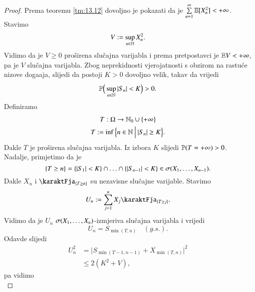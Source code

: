 \begin{proof}
    Prema teoremu \ref{tm:13.12} dovoljno je pokazati da je $\sum\limits_{n = 1}^{\infty} \mathbb{E} [ X_n^2 ] < +\infty$.
    Stavimo
    \begin{equation*}
        V := \sup\limits_{n \in \mathbb{N}} X_n^2.
    \end{equation*}
    Vidimo da je $V \geq 0$ pro\v sirena slu\v cajna varijabla i prema pretpostavci je $\mathbb{E} V < +\infty$, pa je $V$ slu\v cajna varijabla.
    Zbog neprekidnosti vjerojatnosti s obzirom na rastu\' ce nizove doga\dj aja, slijedi da postoji $K > 0$ dovoljno velik, takav da vrijedi
    \begin{equation*}
        \mathbb{P} \Big( \sup\limits_{n \in \mathbb{N}} |S_n| < K \Big) > 0.
    \end{equation*}
    Definiramo
    \begin{equation*}
        \begin{gathered}
            T: \Omega \to \mathbb{N}_0 \cup \{+\infty\}\\
            T:= \inf \Big\{ {n \in \mathbb{N}} \: \Big| \: {|S_n| \geq K} \Big\}.
        \end{gathered}
    \end{equation*}
    Dakle $T$ je pro\v sirena slu\v cajna varijabla.
    Iz izbora $K$ slijedi $\mathbb{P} (T = +\infty) > 0$.
    Nadalje, primjetimo da je
    \begin{equation*}
        \{T \geq n\} = \{ |S_1| < K \} \cap \ldots \cap \{|S_{n-1}| < K\} \in \sigma({X_1, \ldots, X_{n-1}}).
    \end{equation*}
    Dakle $X_n$ i $\karaktFja_{\{T \geq n\}}$ su nezavisne slu\v cajne varijable.
    Stavimo
    \begin{equation*}
        U_n := \suma{j = 1}{n} X_j \karaktFja_{\{T \geq j\}}.
    \end{equation*}
    Vidimo da je $U_n$ $\sigma({X_1, \ldots, X_n})$-izmjeriva slu\v cajna varijabla i vrijedi
    \begin{equation*}
        U_n = S_{\min (T, n)} \quad (g.s.).
    \end{equation*}
    Odavde slijedi
    \begin{equation*}
        \begin{aligned}
            U_n^2 &= \big| S_{\min (T - 1, n - 1)} + X_{\min (T, n)} \big|^2\\
            &\leq 2 (K^2 + V),
        \end{aligned}
    \end{equation*}
    pa vidimo
    \begin{equation*}

\end{equation*}
\end{proof}
